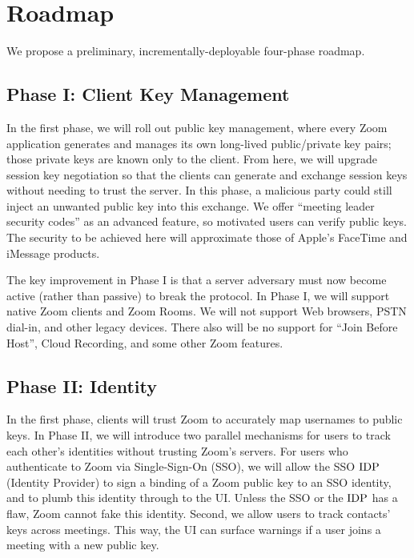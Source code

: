\section{Roadmap}
We propose a preliminary, incrementally-deployable four-phase roadmap.

\subsection{Phase I: Client Key Management}
In the first phase, we will roll out public key management, where every Zoom application generates and manages its own long-lived public/private key pairs; those private keys are known only to the client. From here, we will upgrade session key negotiation so that the clients can generate and exchange session keys without needing to trust the server. In this phase, a malicious party could still inject an unwanted public key into this exchange. We offer ``meeting leader security codes'' as an advanced feature, so motivated users can verify public keys. The security to be achieved here will approximate those of Apple's FaceTime and iMessage products.

The key improvement in Phase I is that a server adversary must now become active (rather than passive) to break the protocol. In Phase I, we will support native Zoom clients and Zoom Rooms. We will not support Web browsers, PSTN dial-in, and other legacy devices. There also will be no support for ``Join Before Host'', Cloud Recording, and some other Zoom features.

\subsection{Phase II: Identity}
In the first phase, clients will trust Zoom to accurately map usernames to public keys. In Phase II, we will introduce two parallel mechanisms for users to track each other's identities without trusting Zoom's servers.  For users who authenticate to Zoom via Single-Sign-On (SSO), we will allow the SSO $\mathrm{IDP}$ (Identity Provider) to sign a binding of a Zoom public key to an SSO identity, and to plumb this identity through to the UI. Unless the SSO or the $\mathrm{IDP}$ has a flaw, Zoom cannot fake this identity. Second, we allow users to track contacts' keys across meetings. This way, the UI can surface warnings if a user joins a meeting with a new public key. 

